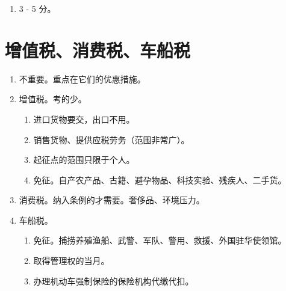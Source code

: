 \begin{enumerate}
  \item 3 - 5 分。
\end{enumerate}

\section{增值税、消费税、车船税}
\begin{enumerate}
  \item 不重要。重点在它们的优惠措施。
  \item 增值税。考的少。
        \begin{enumerate}
          \item 进口货物要交，出口不用。
          \item 销售货物、提供应税劳务（范围非常广）。
          \item 起征点的范围只限于个人。
          \item 免征。自产农产品、古籍、避孕物品、科技实验、残疾人、二手货。
        \end{enumerate}
  \item 消费税。纳入条例的才需要。奢侈品、环境压力。
  \item 车船税。
        \begin{enumerate}
          \item 免征。捕捞养殖渔船、武警、军队、警用、救援、外国驻华使领馆。
          \item 取得管理权的当月。
          \item 办理机动车强制保险的保险机构代缴代扣。
        \end{enumerate}
\end{enumerate}
